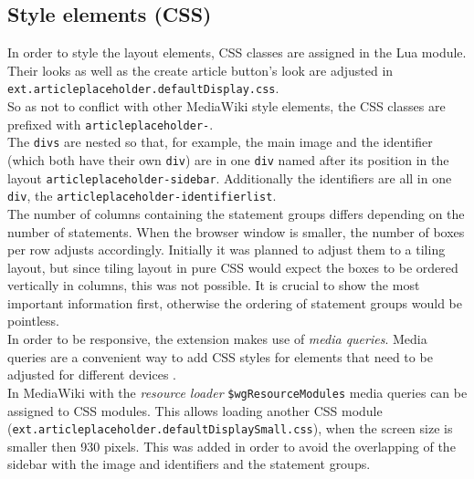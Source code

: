 \subsection{Style elements (CSS)}

In order to style the layout elements, CSS classes are assigned in the Lua module. Their looks as well as the create article button's look are adjusted in \texttt{ext.articleplaceholder.defaultDisplay.css}. \\
So as not to conflict with other MediaWiki style elements, the CSS classes are prefixed with \texttt{\justify articleplaceholder-}. \\
The \texttt{\justify divs} are nested so that, for example, the main image and the identifier (which both have their own \texttt{div}) are in one \texttt{div} named after its position in the layout \texttt{\justify articleplaceholder-sidebar}. Additionally the identifiers are all in one \texttt{div}, the \texttt{\justify articleplaceholder-identifierlist}. \\
The number of columns containing the statement groups differs depending on the number of statements. When the browser window is smaller, the number of boxes per row adjusts accordingly. Initially it was planned to adjust them to a tiling layout, but since tiling layout in pure CSS would expect the boxes to be ordered vertically in columns, this was not possible. It is crucial to show the most important information first, otherwise the ordering of statement groups would be pointless. \\
In order to be responsive, the extension makes use of \textit{media queries}. Media queries are a convenient way to add CSS styles for elements that need to be adjusted for different devices \citep[43]{mediaquery}.\\
In MediaWiki with the \textit{resource loader} \texttt{\justify \$wgResourceModules} media queries can be assigned to CSS modules. This allows loading another CSS module (\texttt{\justify ext.articleplaceholder.defaultDisplaySmall.css}), when the screen size is smaller then 930 pixels. This was added in order to avoid the overlapping of the sidebar with the image and identifiers and the statement groups.